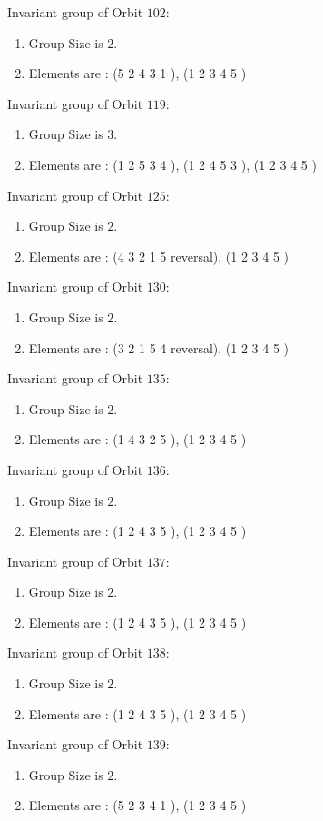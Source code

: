 \documentclass[12pt]{article}
\begin{document}
Invariant group of Orbit $102$:
\begin{enumerate}
\item Group Size is $2$.
\item Elements are : (5 2 4 3 1  ), (1 2 3 4 5  )
\end{enumerate}
Invariant group of Orbit $119$:
\begin{enumerate}
\item Group Size is $3$.
\item Elements are : (1 2 5 3 4  ), (1 2 4 5 3  ), (1 2 3 4 5  )
\end{enumerate}
Invariant group of Orbit $125$:
\begin{enumerate}
\item Group Size is $2$.
\item Elements are : (4 3 2 1 5   reversal), (1 2 3 4 5  )
\end{enumerate}
Invariant group of Orbit $130$:
\begin{enumerate}
\item Group Size is $2$.
\item Elements are : (3 2 1 5 4   reversal), (1 2 3 4 5  )
\end{enumerate}
Invariant group of Orbit $135$:
\begin{enumerate}
\item Group Size is $2$.
\item Elements are : (1 4 3 2 5  ), (1 2 3 4 5  )
\end{enumerate}
Invariant group of Orbit $136$:
\begin{enumerate}
\item Group Size is $2$.
\item Elements are : (1 2 4 3 5  ), (1 2 3 4 5  )
\end{enumerate}
Invariant group of Orbit $137$:
\begin{enumerate}
\item Group Size is $2$.
\item Elements are : (1 2 4 3 5  ), (1 2 3 4 5  )
\end{enumerate}
Invariant group of Orbit $138$:
\begin{enumerate}
\item Group Size is $2$.
\item Elements are : (1 2 4 3 5  ), (1 2 3 4 5  )
\end{enumerate}
Invariant group of Orbit $139$:
\begin{enumerate}
\item Group Size is $2$.
\item Elements are : (5 2 3 4 1  ), (1 2 3 4 5  )
\end{enumerate}
\end{document}
